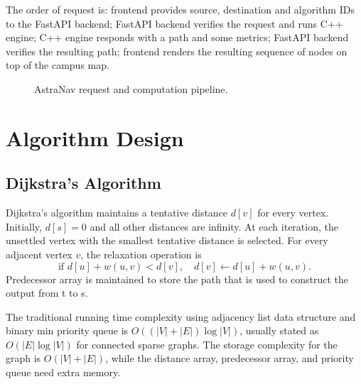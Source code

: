 \documentclass[conference]{IEEEtran}
\begin{document}
The order of request is: frontend provides source, destination and algorithm IDs to the FastAPI backend; FastAPI backend verifies the request and runs C++ engine; C++ engine responds with a path and some metrics; FastAPI backend verifies the resulting path; frontend renders the resulting sequence of nodes on top of the campus map.

\begin{figure}[t]
\centering
{}
\caption{AstraNav request and computation pipeline.}
\label{fig:architecture}
\end{figure}

\section{Algorithm Design}
\subsection{Dijkstra's Algorithm}
Dijkstra's algorithm maintains a tentative distance $d[v]$ for every vertex. Initially, $d[s]=0$ and all other distances are infinity. At each iteration, the unsettled vertex with the smallest tentative distance is selected. For every adjacent vertex $v$, the relaxation operation is
\begin{equation}
    \text{if }d[u]+w(u,v)<d[v],\quad
    d[v]\leftarrow d[u]+w(u,v).
\end{equation}
Predecessor array is maintained to store the path that is used to construct the output from t to s.

The traditional running time complexity using adjacency list data structure and binary min priority queue is
$O((|V|+|E|)\log |V|)$, usually stated as
$O(|E|\log |V|)$ for connected sparse graphs. The storage complexity for the graph is
$O(|V|+|E|)$, while the distance array, predecessor array, and priority queue need extra memory.
\end{document}
